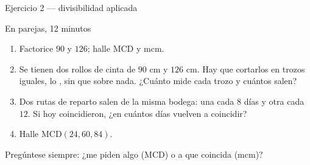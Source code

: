 \documentclass[aspectratio=169,10pt]{beamer}
\begin{document}
	\begin{frame}{Ejercicio 2 — divisibilidad aplicada}
		\scriptsize
		\begin{alertblock}{En parejas, 12 minutos}
			\tiny
			\begin{enumerate}\setlength{\itemsep}{-0.02cm}
				\item Factorice $90$ y $126$; halle $\mathrm{MCD}$ y $\mathrm{mcm}$.
				\item Se tienen dos rollos de cinta de $90$ cm y $126$ cm. Hay que
				cortarlos en trozos iguales, lo , sin que
				sobre nada. ¿Cuánto mide cada trozo y cuántos salen?
				\item Dos rutas de reparto salen de la misma bodega: una cada $8$ días y
				otra cada $12$. Si hoy coincidieron, ¿en cuántos días vuelven a
				coincidir?
				\item Halle $\mathrm{MCD}(24,60,84)$.
			\end{enumerate}
		\end{alertblock}
		
		\vspace{0.05cm}
		{\tiny\color{uniGris} Pregúntese siempre: ¿me piden  algo
			(MCD) o  a que coincida (mcm)?}
	\end{frame}
	
\end{document}
